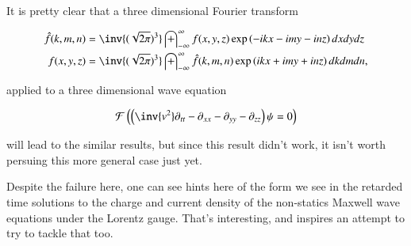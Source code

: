\documentclass{article}
\newcommand{\FF}[0]{\mathcal{F}}
\newcommand{\IIinf}[0]{ \int_{-\infty}^\infty }
\begin{document}
It is pretty clear that a three dimensional Fourier transform

\begin{align*}
\hat{f}(k,m,n) &= \inv{(\sqrt{2\pi})^3} \IIinf f(x,y,z) \exp\left( -i k x - i m y - i n z \right) dx dy dz \\
{f}(x,y,z) &= \inv{(\sqrt{2\pi})^3} \IIinf \hat{f}(k,m,n) \exp\left( i k x + i m y + i n z \right) dk dm dn,
\end{align*}

applied to a three dimensional wave equation

\begin{align*}
\FF\left( \left(\inv{v^2} \partial_{tt} -\partial_{xx} -\partial_{yy} -\partial_{zz} \right)\psi = 0 \right)
\end{align*}

will lead to the similar results, but since this result didn't work, it isn't worth persuing this more general case just yet.

Despite the failure here, one can see hints here of the form we see in the retarded time solutions to the charge and current density of the non-statics Maxwell wave equations under the Lorentz gauge.  That's interesting, and inspires an attempt to try to tackle that too.

%
%
%




\end{document}
